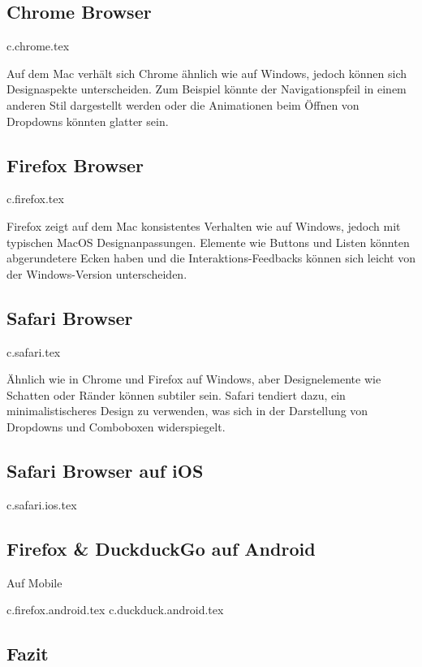 \clearpage
\subsection{Chrome Browser}
{c.chrome.tex}

Auf dem Mac verhält sich Chrome ähnlich wie auf Windows, jedoch können sich Designaspekte unterscheiden. 
Zum Beispiel könnte der Navigationspfeil in einem anderen Stil dargestellt werden oder 
die Animationen beim Öffnen von Dropdowns könnten glatter sein.

\clearpage
\subsection{Firefox Browser}
{c.firefox.tex}

Firefox zeigt auf dem Mac konsistentes Verhalten wie auf Windows, jedoch mit typischen MacOS Designanpassungen. 
Elemente wie Buttons und Listen könnten abgerundetere Ecken haben und 
die Interaktions-Feedbacks können sich leicht von der Windows-Version unterscheiden.

\clearpage
\subsection{Safari Browser}
{c.safari.tex}

Ähnlich wie in Chrome und Firefox auf Windows, aber Designelemente wie Schatten oder Ränder können subtiler sein. 
Safari tendiert dazu, ein minimalistischeres Design zu verwenden, was sich in der Darstellung von Dropdowns und Comboboxen widerspiegelt.

\clearpage
\subsection{Safari Browser auf iOS}
{c.safari.ios.tex}


\clearpage
\subsection{Firefox \& DuckduckGo auf Android}

Auf Mobile 

{c.firefox.android.tex}
{c.duckduck.android.tex}


\clearpage
\subsection{Fazit}

